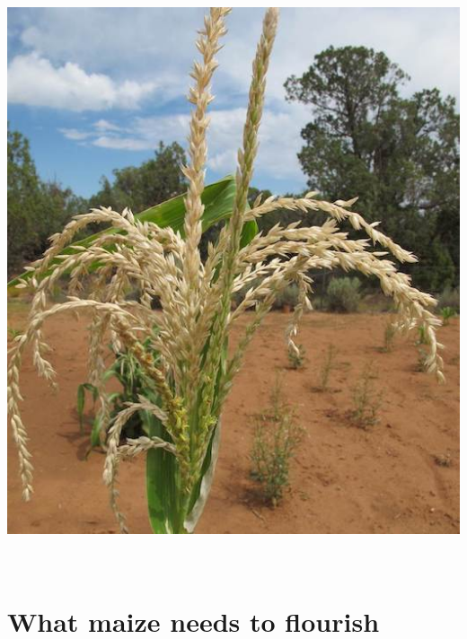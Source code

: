 \documentclass[12pt,]{article}
\begin{document}
\includegraphics{./images/growth/13_maturity.jpg}

~

\hypertarget{what-maize-needs-to-flourish}{%
\section{What maize needs to flourish}\label{what-maize-needs-to-flourish}}
\end{document}
